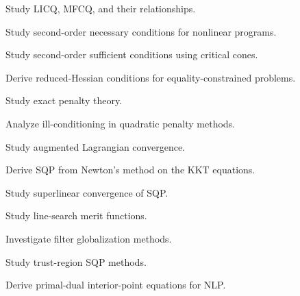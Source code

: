 \begin{exercise}[4]
Study LICQ, MFCQ, and their relationships.
\end{exercise}

\begin{exercise}[4]
Study second-order necessary conditions for nonlinear programs.
\end{exercise}

\begin{exercise}[4]
Study second-order sufficient conditions using critical cones.
\end{exercise}

\begin{exercise}[4]
Derive reduced-Hessian conditions for equality-constrained problems.
\end{exercise}

\begin{exercise}[4]
Study exact penalty theory.
\end{exercise}

\begin{exercise}[4]
Analyze ill-conditioning in quadratic penalty methods.
\end{exercise}

\begin{exercise}[4]
Study augmented Lagrangian convergence.
\end{exercise}

\begin{exercise}[4]
Derive SQP from Newton's method on the KKT equations.
\end{exercise}

\begin{exercise}[4]
Study superlinear convergence of SQP.
\end{exercise}

\begin{exercise}[4]
Study line-search merit functions.
\end{exercise}

\begin{exercise}[4]
Investigate filter globalization methods.
\end{exercise}

\begin{exercise}[4]
Study trust-region SQP methods.
\end{exercise}

\begin{exercise}[4]
Derive primal-dual interior-point equations for NLP.
\end{exercise}

